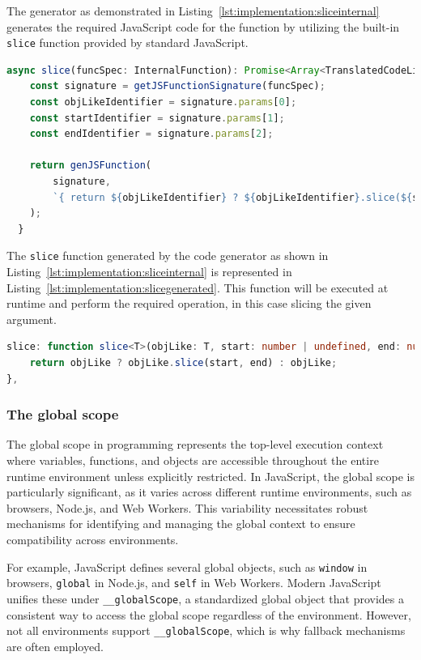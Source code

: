 The generator as demonstrated in Listing~\ref{lst:implementation:sliceinternal} generates the required JavaScript code for the function by utilizing the built-in \lstinline|slice| function provided by standard JavaScript.

\begin{lstlisting}[language=TypeScript,caption=Slice in the JavaScript BuiltInGenerator,label=lst:implementation:sliceinternal]
async slice(funcSpec: InternalFunction): Promise<Array<TranslatedCodeLine>> {
	const signature = getJSFunctionSignature(funcSpec);
	const objLikeIdentifier = signature.params[0];
	const startIdentifier = signature.params[1];
	const endIdentifier = signature.params[2];

	return genJSFunction(
		signature,
		`{ return ${objLikeIdentifier} ? ${objLikeIdentifier}.slice(${startIdentifier}, ${endIdentifier}) : ${objLikeIdentifier}; }`,
	);
  }
\end{lstlisting}

The \lstinline|slice| function generated by the code generator as shown in Listing~\ref{lst:implementation:sliceinternal} is represented in Listing~\ref{lst:implementation:slicegenerated}. This function will be executed at runtime and perform the required operation, in this case slicing the given argument.

\begin{lstlisting}[language=TypeScript,caption=Slice in the target language TypeScript,label=lst:implementation:slicegenerated]
slice: function slice<T>(objLike: T, start: number | undefined, end: number | undefined): T {
	return objLike ? objLike.slice(start, end) : objLike;
},
\end{lstlisting}

\subsubsection{The global scope}

The global scope in programming represents the top-level execution context where variables, functions, and objects are accessible throughout the entire runtime environment unless explicitly restricted. In JavaScript, the global scope is particularly significant, as it varies across different runtime environments, such as browsers, Node.js, and Web Workers. This variability necessitates robust mechanisms for identifying and managing the global context to ensure compatibility across environments.

For example, JavaScript defines several global objects, such as \lstinline|window| in browsers, \lstinline|global| in Node.js, and \lstinline|self| in Web Workers. Modern JavaScript unifies these under \lstinline|__globalScope|, a standardized global object that provides a consistent way to access the global scope regardless of the environment. However, not all environments support \lstinline|__globalScope|, which is why fallback mechanisms are often employed.

